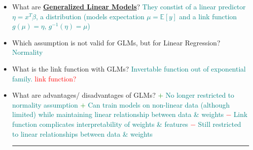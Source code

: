 \documentclass{report}
\newcommand{\asw}[2][teal]{}
\renewcommand{\asw}[2][teal]{\textcolor{#1}{#2}}
\newcommand{\qst}[2][red]{\textcolor{#1}{#2}}
\begin{document}
\begin{itemize}
	\item What are \textbf{\underline{Generalized Linear Models}}?
	\asw{\newline They constist of a linear predictor $\eta = x^T \beta$, a distribution (models expectation $\mu = \mathbb{E}[y]$ and a link function $g(\mu) = \eta$, $g^{-1}(\eta) = \mu$)}
	\item Which assumption is not valid for GLMs, but for Linear Regression?
	\asw{\newline Normality}
	\item What is the link function with GLMs?
	\asw{\newline Invertable function out of exponential family. \qst{link function?}}
	\item What are advantages/ disadvantages of GLMs?
	\asw{\newline \textcolor{green}{$+$} No longer restricted to normality assumption
		\newline \textcolor{green}{$+$} Can train models on non-linear data (although limited) while maintaining linear relationship between data \& weights
		\newline \textcolor{red}{$-$} Link function complicates interpretability of weights \& features
		\newline \textcolor{red}{$-$} Still restricted to linear relationships between data \& weights}
	\newline
	\hrule 
	

\end{itemize}
\end{document}
